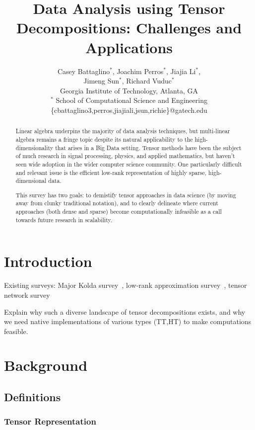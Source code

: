 \documentclass[leqno,onefignum,onetabnum]{siamltex1213}
\title{Data Analysis using Tensor Decompositions: Challenges and Applications}
\author{
  Casey Battaglino$^\ast$, Joachim Perros$^\ast$, Jiajia Li$^\ast$, \\
   Jimeng Sun$^\ast$, Richard Vuduc$^\ast$
  \\ Georgia Institute of Technology, Atlanta, GA
  \\ $^\ast$ School of Computational Science and Engineering \\
  \{cbattaglino3,perros,jiajiali,jsun,richie\}@gatech.edu } \date{}
\begin{document}

\maketitle

\begin{abstract}
Linear algebra underpins the majority of data analysis techniques, but multi-linear algebra remains a fringe topic despite its natural applicability to the high-dimensionality that arises in a Big Data setting. Tensor methods have been the subject of much research in signal processing, physics, and applied mathematics, but haven't seen wide adoption in the wider computer science community. One particularly difficult and relevant issue is the efficient low-rank representation of highly sparse, high-dimensional data.

This survey has two goals: to demistify tensor approaches in data science (by moving away from clunky traditional notation), and to clearly delineate where current approaches (both dense and sparse) become computationally infeasible as a call towards future research in scalability.
\end{abstract}

\section{Introduction} \label{sec:intro}

Existing surveys: Major Kolda survey~\cite{Kolda09tensordecompositions}, low-rank approximation survey~\cite{larskres-survey-2013}, tensor network survey~\cite{DBLP:journals/corr/Cichocki14}

Explain why such a diverse landscape of tensor decompositions exists, and why we need native implementations of various types (TT,HT) to make computations feasible.

\section{Background} \label{sec:background}
\subsection{Definitions} \label{sec:definitions}
\subsubsection{Tensor Representation}
\end{document}
